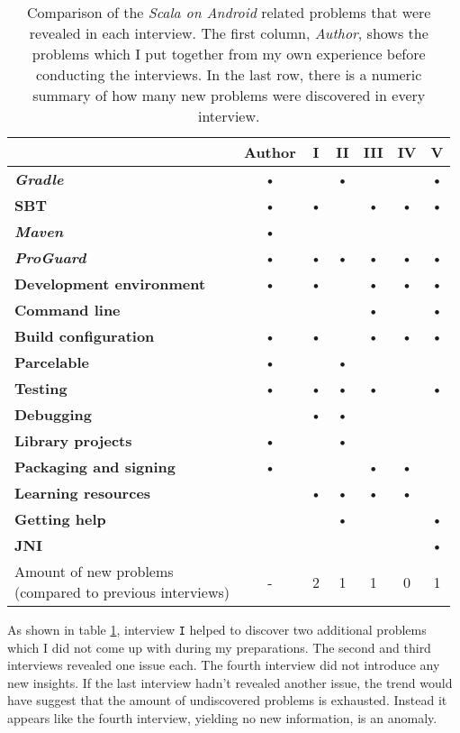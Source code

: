 \begin{table}[b]
	\begin{tabular}{|l|c|c|c|c|c|c|}\hline
		\diagbox{\textbf{Problem}}{\textbf{Interview}} & \textbf{Author} & \textbf{I} & \textbf{II} & \textbf{III} & \textbf{IV} & \textbf{V} \\ \hline
		\textbf{\textit{Gradle}}			& • &   & • &   &   & • \\ \hline
		\textbf{\ac{SBT}}					& • & • &   & • & • & • \\ \hline
		\textbf{\textit{Maven}}				& • &   &   &   &   &   \\ \hline
		\textbf{\textit{ProGuard}}			& • & • & • & • & • & • \\ \hline
		\textbf{Development environment}	& • & • &   & • & • & • \\ \hline
		\textbf{Command line}				&   &   &   & • &   & • \\ \hline
		\textbf{Build configuration}		& • & • &   & • & • & • \\ \hline
		\textbf{Parcelable}					& • &   & • &   &   &   \\ \hline
		\textbf{Testing}					& • & • & • & • &   & • \\ \hline
		\textbf{Debugging}					&   & • & • &   &   &   \\ \hline
		\textbf{Library projects}			& • &   & • &   &   &   \\ \hline
		\textbf{Packaging and signing}		& • &   &   & • & • &   \\ \hline
		\textbf{Learning resources}			&   & • & • & • & • &   \\ \hline
		\textbf{Getting help}				&   &   & • &   &   & • \\ \hline
		\textbf{JNI}						&   &   &   &   &   & • \\ \hline \hline
		\pbox{10cm}{Amount of new problems\\(compared to previous interviews)} & - & 2 & 1 & 1 & 0 & 1 \\ \hline
	\end{tabular}
	\caption{Comparison of the \textit{Scala on Android} related problems that were revealed in each interview. The first column, \textit{Author}, shows the problems which I put together from my own experience before conducting the interviews. In the last row, there is a numeric summary of how many new problems were discovered in every interview.}
	\label{interviews-comparison}
\end{table}

As shown in table \ref{interviews-comparison}, interview \texttt{I} helped to discover two additional problems which I did not come up with during my preparations. The second and third interviews revealed one issue each. The fourth interview did not introduce any new insights. If the last interview hadn't revealed another issue, the trend would have suggest that the amount of undiscovered problems is exhausted. Instead it appears like the fourth interview, yielding no new information, is an anomaly.

